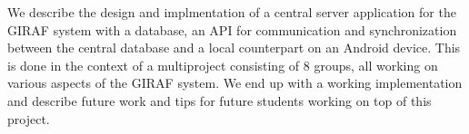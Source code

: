 We describe the design and implmentation of a central server application for the GIRAF system with a database, an API for communication and synchronization between the central database and a local counterpart on an Android device. This is done in the context of a multiproject consisting of 8 groups, all working on various aspects of the GIRAF system. We end up with a working implementation and describe future work and tips for future students working on top of this project.